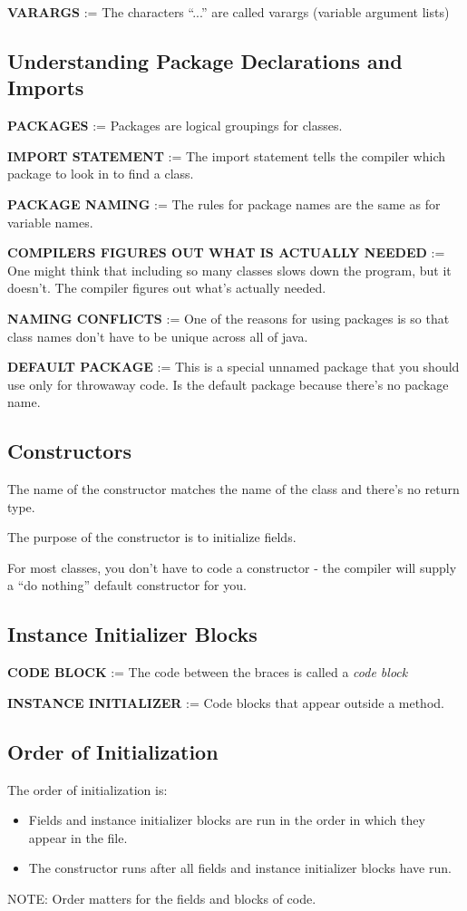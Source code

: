 \documentclass{article}
\begin{document}
\textbf{VARARGS} := The characters ``...'' are called varargs (variable argument lists)

\subsection{Understanding Package Declarations and Imports}
\textbf{PACKAGES} := Packages are logical groupings for classes.

\textbf{IMPORT STATEMENT} := The import statement tells the compiler which package to look in to find a class.

\textbf{PACKAGE NAMING} := The rules for package names are the same as for variable names.

\textbf{COMPILERS FIGURES OUT WHAT IS ACTUALLY NEEDED} := One might think that including so many classes slows down the program, but it doesn't. The compiler figures out what's actually needed.

\textbf{NAMING CONFLICTS} := One of the reasons for using packages is so that class names don't have to be unique across all of java.

\textbf{DEFAULT PACKAGE} := This is a special unnamed package that you should use only for throwaway code. Is the default package because there's no package name.

\subsection{Constructors}
The name of the constructor matches the name of the class and there's no return type.

The purpose of the constructor is to initialize fields.

For most classes, you don't have to code a constructor - the compiler will supply a ``do nothing'' default constructor for you.

\subsection{Instance Initializer Blocks}
\textbf{CODE BLOCK} := The code between the braces is called a \textit{code block}

\textbf{INSTANCE INITIALIZER} := Code blocks that appear outside a method.

\subsection{Order of Initialization}
The order of initialization is:
\begin{itemize}
	\item Fields and instance initializer blocks are run in the order in which they appear in the file.
	\item The constructor runs after all fields and instance initializer blocks have run.
\end{itemize}
NOTE: Order matters for the fields and blocks of code.
\end{document}
